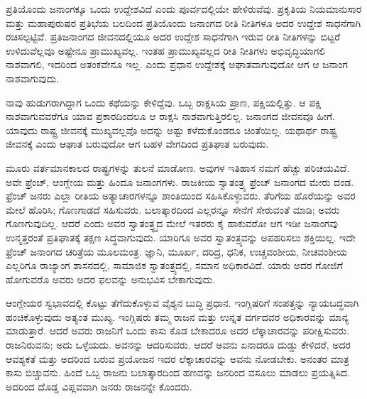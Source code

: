 ಪ್ರತಿಯೊಂದು ಜನಾಂಗಕ್ಕೂ ಒಂದು ಉದ್ದೇಶವಿದೆ ಎಂದು ಪೂರ್ವದಲ್ಲಿಯೇ ಹೇಳಿರು\-ವೆವು. ಪ್ರಕೃತಿಯ ನಿಯಮಾನುಸಾರ ಮತ್ತು ಮಹಾಪುರುಷರ ಪ್ರತಿಭೆಯ ಬಲದಿಂದ ಪ್ರತಿಯೊಂದು ಜನಾಂಗದ ರೀತಿ ನೀತಿಗಳೂ ಅದರ ಉದ್ದೇಶ ಸಾಧನೆಗಾಗಿ ರಚಿಸಲ್ಪಟ್ಟಿವೆ. ಪ್ರತಿಜನಾಂಗದ ಜೀವನದಲ್ಲಿಯೂ ಅದರ ಉದ್ದೇಶ ಸಾಧನೆಗಾಗಿ ಇರುವ ರೀತಿ ನೀತಿಗಳನ್ನು ಬಿಟ್ಟರೆ ಉಳಿದುವೆಲ್ಲವೂ ಅಷ್ಟೇನೂ ಪ್ರಾಮುಖ್ಯವಲ್ಲ. ಇಂತಹ ಪ್ರಾಮುಖ್ಯವಲ್ಲದ ರೀತಿ ನೀತಿಗಳು ಅಭಿವೃದ್ಧಿಯಾಗಲಿ ನಾಶವಾಗಲಿ, ಇದರಿಂದ ಅತಂಕವೇನೂ ಇಲ್ಲ. ಎಂದು ಪ್ರಧಾನ ಉದ್ದೇಶಕ್ಕೆ ಅಘಾತವಾಗುವುದೋ ಆಗ ಆ ಜನಾಂಗ ನಾಶವಾಗುವುದು.

ನಾವು ಹುಡುಗರಾಗಿದ್ದಾಗ ಒಂದು ಕಥೆಯನ್ನು ಕೇಳಿದ್ದೆವು. ಒಬ್ಬ ರಾಕ್ಷಸಿಯ ಪ್ರಾಣ, ಪಕ್ಷಿಯಲ್ಲಿತ್ತು. ಆ ಪಕ್ಷಿ ನಾಶವಾಗುವವರೆಗೂ ಯಾವ ಪ್ರಕಾರದಿಂದಲೂ ಆ ರಾಕ್ಷಸಿ ನಾಶವಾಗುತ್ತಿರಲಿಲ್ಲ. ಜನಾಂಗದ ಜೀವನವೂ ಹೀಗೆ. ಯಾವುದು ರಾಷ್ಟ್ರ ಜೀವನಕ್ಕೆ ಮುಖ್ಯವಲ್ಲವೊ ಅದನ್ನು ಅಷ್ಟು ಕಳೆದುಕೊಂಡರೂ ಚಿಂತೆಯಿಲ್ಲ. ಯಥಾರ್ಥ ರಾಷ್ಟ್ರ ಜೀವನಕ್ಕೆ ಎಂದು ಆಘಾತ ಬರುವುದೋ ಆಗ ಬಹಳ ವೇಗದಿಂದ ಪ್ರತಿಘಾತ ಬರುವುದು.

ಮೂರು ವರ್ತಮಾನಕಾಲದ ರಾಷ್ಟ್ರಗಳನ್ನು ತುಲನೆ ಮಾಡೋಣ. ಅವುಗಳ ಇತಿಹಾಸ ನಮಗೆ ಹೆಚ್ಚು ಪರಿಚಯವಿದೆ. ಅವೇ ಫ್ರೆಂಚ್​, ಆಂಗ್ಲೇಯ ಮತ್ತು ಹಿಂದೂ ಜನಾಂಗಗಳು. ರಾಜಕೀಯ ಸ್ವಾತಂತ್ರ್ಯ ಫ್ರೆಂಚ್​ ಜನಾಂಗದ ಮೇರು ದಂಡ. ಫ್ರೆಂಚ್​ ಜನರು ಎಲ್ಲಾ ರೀತಿಯ ಅತ್ಯಾಚಾರಗಳನ್ನೂ ಶಾಂತಿಯಿಂದ ಸಹಿಸಿಕೊಳ್ಳುವರು. ತೆರಿಗೆಯ ಹೊರೆಯನ್ನು ಅವರ ಮೇಲೆ ಹೊರಿಸಿ; ಗೊಣಗಾಡದೆ ಸಹಿಸುವರು. ಬಲಾತ್ಕಾರದಿಂದ ಎಲ್ಲರನ್ನೂ ಸೇನೆಗೆ ಸೇರುವಂತೆ ಮಾಡಿ; ಅವರು ಗೊಣಗುವುದಿಲ್ಲ. ಆದರೆ ಎಂದು ಅವರ ಸ್ವಾತಂತ್ರ್ಧ್ಯದ ಮೇಲೆ ಇತರರು ಕೈ ಹಾಕುವರೋ ಆಗ ಇಡೀ ಜನಾಂಗವು ಉನ್ಮತ್ತರಂತೆ ಪ್ರತಿಘಾತಕ್ಕೆ ತಕ್ಷಣ ಸಿದ್ಧವಾಗುವುದು. ಯಾರಿಗೂ ಅವರ ಸ್ವಾತಂತ್ರ್ಯವನ್ನು ಅಪಹರಿಸಲು ಶಕ್ತಿಯಿಲ್ಲ. ಇದೇ ಫ್ರೆಂಚ್​ ಜನಾಂಗದ ಚರಿತ್ರೆಯ ಮೂಲಮಂತ್ರ. ಜ್ಞಾನಿ, ಮೂರ್ಖ, ದರಿದ್ರ, ಧನಿಕ, ಉಚ್ಚವಂಶೀಯ, ನೀಚವಂಶೀಯ ಎಲ್ಲರಿಗೂ ರಾಜ್ಯಾಂಗ ಶಾಸನದಲ್ಲಿ, ಸಾಮಾಜಿಕ ಸ್ವಾತಂತ್ರ್ಯದಲ್ಲಿ, ಸಮಾನ ಅಧಿಕಾರವಿದೆ. ಯಾರು ಅದರ ಗೋಜಿಗೆ ಹೋಗುವರೊ ಅವರು ಅದರ ಫಲವನ್ನು ಅನುಭವಿಸ ಬೇಕಾಗುವುದು.

ಆಂಗ್ಲೇಯರ ಸ್ವಭಾವದಲ್ಲಿ ಕೊಟ್ಟು ತೆಗೆದುಕೊಳ್ಳುವ ವೈಶ್ಯನ ಬುದ್ಧಿ ಪ್ರಧಾನ. ಇಂಗ್ಲಿಷರಿಗೆ ಸಂಪತ್ತನ್ನು ನ್ಯಾಯಬದ್ಧವಾಗಿ ಹಂಚಿಕೊಳ್ಳುವುದು ಅತ್ಯಂತ ಮುಖ್ಯ. ಇಂಗ್ಲಿಷರು ತಮ್ಮ ರಾಜನ ಮತ್ತು ಉನ್ನತ ವರ್ಗದವರ ಅಧಿಕಾರವನ್ನು ಮಾನ್ಯ ಮಾಡುತ್ತಾರೆ. ಆದರೆ ಅವರು ರಾಜನಿಗೆ ಒಂದು ಕಾಸು ಕೊಡ ಬೇಕಾದರೂ ಅದರ ಲೆಕ್ಕಾಚಾರವನ್ನು ಪರೀಕ್ಷಿಸುವರು. ರಾಜನಿರುವನು; ಅದು ಒಳ್ಳೆಯದು. ಅವನನ್ನು ಆದರಿಸುವರು. ಆದರೆ ಅವನು ಏನಾದರೂ ದುಡ್ಡು ಕೇಳಿದರೆ, ಅದರ ಆವಶ್ಯಕತೆ ಮತ್ತು ಅದರಿಂದ ಬರುವ ಪ್ರಯೋಜನ ಇದರ ಲೆಕ್ಕಾಚಾರವನ್ನು ಅವನು ನೋಡಬೇಕು. ಅನಂತರ ಮಾತ್ರ ಕಾಸು ಬಿಚ್ಚುವನು. ಹಿಂದೆ ಒಬ್ಬ ರಾಜನು ಬಲಾತ್ಕಾರದಿಂದ ಹಣವನ್ನು ಜನರಿಂದ ವಸೂಲು ಮಾಡಲು ಪ್ರಯತ್ನಿಸಿದ. ಅದರಿಂದ ದೊಡ್ಡ ವಿಪ್ಲವವಾಗಿ ಜನರು ರಾಜನನ್ನೇ ಕೊಂದರು.

